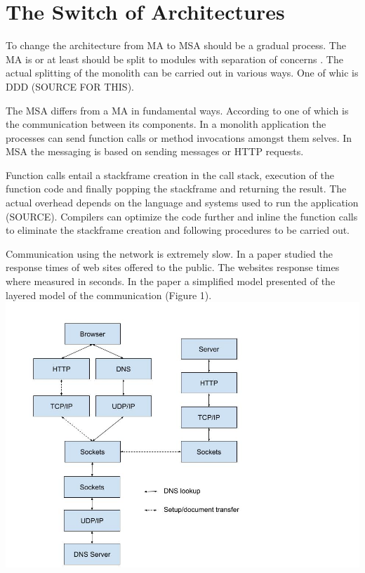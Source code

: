 \section{The Switch of Architectures}
\begin{sloppypar}
    To change the architecture from MA to MSA should be a gradual process. The 
    MA is or at least should be  split to modules with separation of concerns 
    \citep{secchalmsa}. The actual splitting of the monolith can be carried out
     in various ways. One of whic is DDD (SOURCE FOR THIS).
\end{sloppypar}

\begin{sloppypar}
    The MSA differs from a MA in fundamental ways. According to \citet{fowlerlewisms} 
    one of which is the communication between its components. In a monolith 
    application the processes can send function calls or method invocations 
    amongst them selves. In MSA the messaging is based on sending messages or 
    HTTP requests.
\end{sloppypar}

\begin{sloppypar}
    Function calls entail a stackframe creation in the call stack, execution of 
    the function code and finally popping the stackframe and returning the result. 
    The actual overhead depends on the language and systems used to run the 
    application (SOURCE). Compilers can optimize the code further and inline the function calls to
    eliminate the stackframe creation and following procedures to be carried out.
\end{sloppypar}

\begin{sloppypar}
    Communication using the network is extremely slow. In a paper \citet{webdelays} 
    studied the response times of web sites offered to the public. The websites 
    response times where measured in seconds. In the paper a simplified model 
    presented of the layered model of the communication (Figure 1).
    \includegraphics[scale=0.5]{HTTPlayers}
\end{sloppypar}

